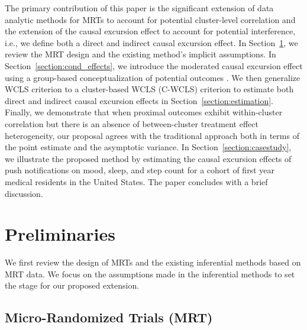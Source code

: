 \documentclass[12pt]{article}
\begin{document}
The primary contribution of this paper is the significant extension of data analytic methods for MRTs to account for potential cluster-level correlation and the extension of the causal excursion effect to account for potential interference, i.e., we define both a direct and indirect causal excursion effect.  In Section~\ref{section:preliminaries}, we review the MRT design and the existing method's implicit assumptions.  In Section~\ref{section:cond_effects}, we introduce the moderated causal excursion effect using a group-based conceptualization of potential outcomes \citep{Hong2006,Vanderweele2013}.  We then generalize WCLS criterion to a cluster-based WCLS (C-WCLS) criterion to estimate both direct and indirect causal excursion effects in Section~\ref{section:estimation}.  Finally, we demonstrate that when proximal outcomes exhibit within-cluster correlation but there is an absence of between-cluster treatment effect heterogeneity, our proposal agrees with the traditional approach both in terms of the point estimate and the asymptotic variance.  In Section~\ref{section:casestudy}, we illustrate the proposed method by estimating the causal excursion effects of push notifications on mood, sleep, and step count for a cohort of first year medical residents in the United States. The paper concludes with a brief discussion.

\section{Preliminaries}
\label{section:preliminaries}

We first review the design of MRTs and the existing inferential methods based on MRT data. We focus on the assumptions made in the inferential methods to set the stage for our proposed extension.

\subsection{Micro-Randomized Trials (MRT)}
\end{document}
